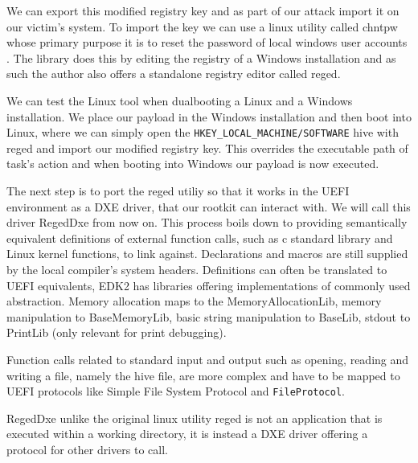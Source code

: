 We can export this modified registry key and as part of our attack import it on our victim's system. To import the key we can use a linux utility called chntpw whose primary purpose it is to reset the password of local windows user accounts \cite{chntpw}. The library does this by editing the registry of a Windows installation and as such the author also offers a standalone registry editor called reged.

We can test the Linux tool when dualbooting a Linux and a Windows installation. We place our payload in the Windows installation and then boot into Linux, where we can simply open the \lstinline{HKEY_LOCAL_MACHINE/SOFTWARE} hive with reged and import our modified registry key.
This overrides the executable path of task's action and when booting into Windows our payload is now executed.


The next step is to port the reged utiliy so that it works in the UEFI environment as a DXE driver, that our rootkit can interact with. We will call this driver RegedDxe from now on.
This process boils down to providing semantically equivalent definitions of external function calls, such as c standard library and Linux kernel functions, to link against. Declarations and macros are still supplied by the local compiler's system headers. Definitions can often be translated to UEFI equivalents, EDK2 has libraries offering implementations of commonly used abstraction.
Memory allocation maps to the MemoryAllocationLib, memory manipulation to BaseMemoryLib, basic string manipulation to BaseLib, stdout to PrintLib (only relevant for print debugging).

Function calls related to standard input and output such as opening, reading and writing a file, namely the hive file, are more complex and have to be mapped to UEFI protocols like Simple File System Protocol and \lstinline{FileProtocol}.


RegedDxe unlike the original linux utility reged is not an application that is executed within a working directory, it is instead a DXE driver offering a protocol for other drivers to call.

